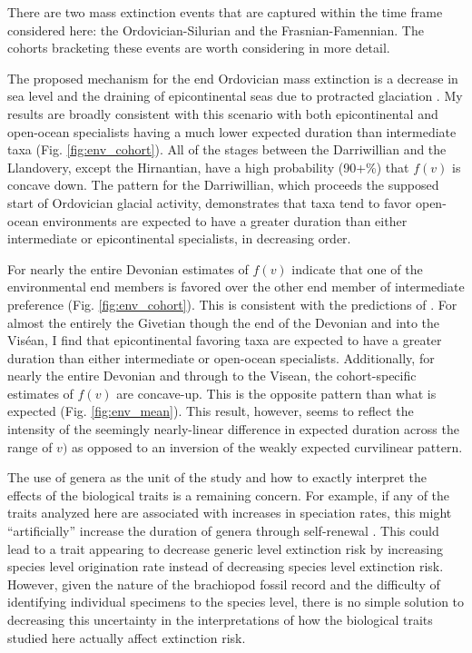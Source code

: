 \documentclass{article}
\begin{document}
There are two mass extinction events that are captured within the time frame considered here: the Ordovician-Silurian and the Frasnian-Famennian. The cohorts bracketing these events are worth considering in more detail.


The proposed mechanism for the end Ordovician mass extinction is a decrease in sea level and the draining of epicontinental seas due to protracted glaciation \citep{Sheehan2001b,Johnson1974}. My results are broadly consistent with this scenario with both epicontinental and open-ocean specialists having a much lower expected duration than intermediate taxa (Fig. \ref{fig:env_cohort}). All of the stages between the Darriwillian and the Llandovery, except the Hirnantian, have a high probability (90+\%) that \(f(v)\) is concave down. The pattern for the Darriwillian, which proceeds the supposed start of Ordovician glacial activity, demonstrates that taxa tend to favor open-ocean environments are expected to have a greater duration than either intermediate or epicontinental specialists, in decreasing order.

For nearly the entire Devonian estimates of \(f(v)\) indicate that one of the environmental end members is favored over the other end member of intermediate preference (Fig. \ref{fig:env_cohort}). This is consistent with the predictions of \citet{Miller2009a}. For almost the entirely the Givetian though the end of the Devonian and into the Vis\'{e}an, I find that epicontinental favoring taxa are expected to have a greater duration than either intermediate or open-ocean specialists. Additionally, for nearly the entire Devonian and through to the Visean, the cohort-specific estimates of \(f(v)\) are concave-up. This is the opposite pattern than what is expected (Fig. \ref{fig:env_mean}). This result, however, seems to reflect the intensity of the seemingly nearly-linear difference in expected duration across the range of \(v)\) as opposed to an inversion of the weakly expected curvilinear pattern.

The use of genera as the unit of the study and how to exactly interpret the effects of the biological traits is a remaining concern. For example, if any of the traits analyzed here are associated with increases in speciation rates, this might ``artificially'' increase the duration of genera through self-renewal \citep{Raup1991b,Raup1994}. This could lead to a trait appearing to decrease generic level extinction risk by increasing species level origination rate instead of decreasing species level extinction risk. However, given the nature of the brachiopod fossil record and the difficulty of identifying individual specimens to the species level, there is no simple solution to decreasing this uncertainty in the interpretations of how the biological traits studied here actually affect extinction risk.
\end{document}
